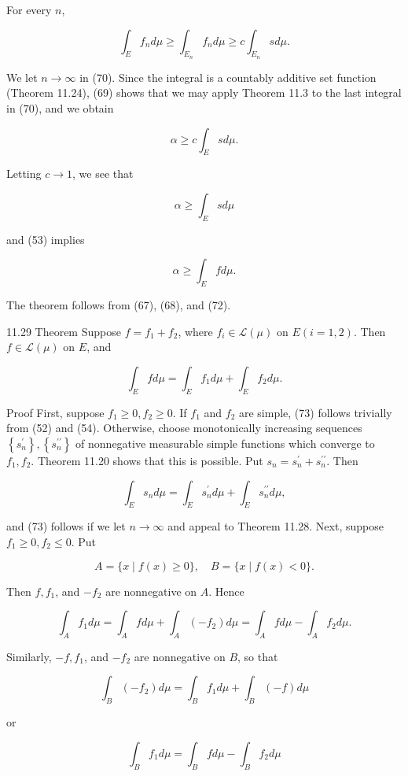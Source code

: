 \documentclass[10pt]{article}
\begin{document}
For every $n$,

$$
\int_{E} f_{n} d \mu \geq \int_{E_{n}} f_{n} d \mu \geq c \int_{E_{n}} s d \mu .
$$

We let $n \rightarrow \infty$ in (70). Since the integral is a countably additive set function (Theorem 11.24), (69) shows that we may apply Theorem 11.3 to the last integral in (70), and we obtain

$$
\alpha \geq c \int_{E} s d \mu .
$$

Letting $c \rightarrow 1$, we see that

$$
\alpha \geq \int_{E} s d \mu
$$

and (53) implies

$$
\alpha \geq \int_{E} f d \mu .
$$

The theorem follows from (67), (68), and (72).

11.29 Theorem Suppose $f=f_{1}+f_{2}$, where $f_{i} \in \mathscr{L}(\mu)$ on $E(i=1,2)$. Then $f \in \mathscr{L}(\mu)$ on $E$, and

$$
\int_{E} f d \mu=\int_{E} f_{1} d \mu+\int_{E} f_{2} d \mu .
$$

Proof First, suppose $f_{1} \geq 0, f_{2} \geq 0$. If $f_{1}$ and $f_{2}$ are simple, (73) follows trivially from (52) and (54). Otherwise, choose monotonically increasing sequences $\left\{s_{n}^{\prime}\right\},\left\{s_{n}^{\prime \prime}\right\}$ of nonnegative measurable simple functions which converge to $f_{1}, f_{2}$. Theorem 11.20 shows that this is possible. Put $s_{n}=s_{n}^{\prime}+s_{n}^{\prime \prime}$. Then

$$
\int_{E} s_{n} d \mu=\int_{E} s_{n}^{\prime} d \mu+\int_{E} s_{n}^{\prime \prime} d \mu,
$$

and (73) follows if we let $n \rightarrow \infty$ and appeal to Theorem 11.28. Next, suppose $f_{1} \geq 0, f_{2} \leq 0$. Put

$$
A=\{x \mid f(x) \geq 0\}, \quad B=\{x \mid f(x)<0\} .
$$

Then $f, f_{1}$, and $-f_{2}$ are nonnegative on $A$. Hence

$$
\int_{A} f_{1} d \mu=\int_{A} f d \mu+\int_{A}\left(-f_{2}\right) d \mu=\int_{A} f d \mu-\int_{A} f_{2} d \mu .
$$

Similarly, $-f, f_{1}$, and $-f_{2}$ are nonnegative on $B$, so that

$$
\int_{B}\left(-f_{2}\right) d \mu=\int_{B} f_{1} d \mu+\int_{B}(-f) d \mu
$$

or

$$
\int_{B} f_{1} d \mu=\int_{B} f d \mu-\int_{B} f_{2} d \mu
$$
\end{document}
